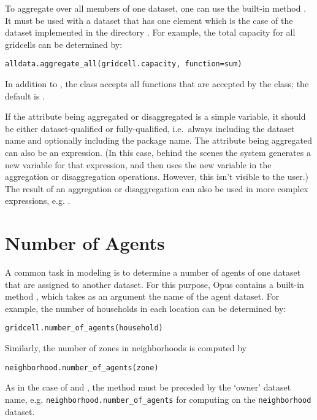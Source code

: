 To aggregate over all members of one dataset, one can use the
built-in method . It must be used with a dataset
  that has one element which is the case of the
 dataset 
implemented in the directory . For example, the total
capacity for all gridcells can be determined by:
\begin{verbatim}
alldata.aggregate_all(gridcell.capacity, function=sum)
\end{verbatim}
In addition to , the  class accepts all
functions that are accepted by the  class;
the default is .

If the attribute being aggregated or disaggregated is a simple variable, it
should be either dataset-qualified or fully-qualified, i.e.\ always
including the dataset name and optionally including the package name.  The
attribute being aggregated can also be an expression.  (In this case,
behind the scenes the system generates a new variable for that expression,
and then uses the new variable in the aggregation or disaggregation
operations.  However, this isn't visible to the user.)  The result of an
aggregation or disaggregation can also be used in more complex expressions,
e.g. .

\section{Number of Agents}

A common task in modeling is to determine a number of agents of one dataset
  that are assigned to another dataset. For this
purpose, Opus contains a built-in method , which
takes as an argument the name of the agent dataset.  For example,
the number of households in each location can be determined by:

\begin{verbatim}
gridcell.number_of_agents(household)
\end{verbatim}

Similarly, the number of zones in neighborhoods is computed by
\begin{verbatim}
neighborhood.number_of_agents(zone)
\end{verbatim}

As in the case of  and , the
 method must be preceded by the `owner' dataset
name, e.g. \verb|neighborhood.number_of_agents| for computing on the
\verb|neighborhood| dataset.

